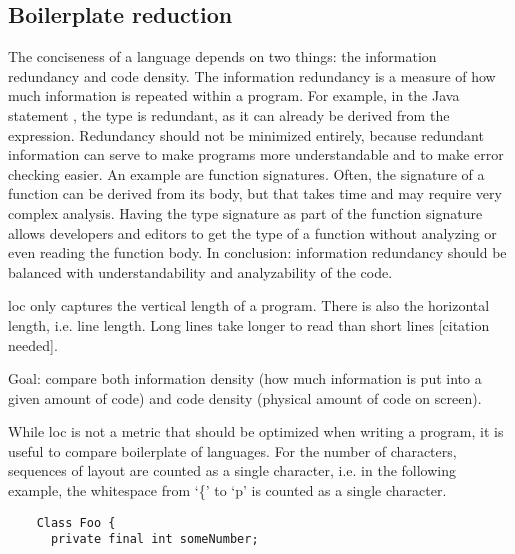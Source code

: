 \subsection{Boilerplate reduction}
\label{subsec:evaluation__analysis__boilerplate_reduction}

The conciseness of a language depends on two things: the information redundancy and code density.
The information redundancy is a measure of how much information is repeated within a program.
For example, in the Java statement , the type  is redundant, as it can already be derived from the expression.
Redundancy should not be minimized entirely, because redundant information can serve to make programs more understandable and to make error checking easier.
An example are function signatures.
Often, the signature of a function can be derived from its body, but that takes time and may require very complex analysis.
Having the type signature as part of the function signature allows developers and editors to get the type of a function without analyzing or even reading the function body.
In conclusion: information redundancy should be balanced with understandability and analyzability of the code.

\Ac{loc} only captures the vertical length of a program.
There is also the horizontal length, i.e. line length.
Long lines take longer to read than short lines [citation needed].


Goal: compare both information density (how much information is put into a given amount of code) and code density (physical amount of code on screen).

While \ac{loc} is not a metric that should be optimized when writing a program, it is useful to compare boilerplate of languages.
For the number of characters, sequences of layout are counted as a single character, i.e. in the following example, the whitespace from `\{' to `p' is counted as a single character.
\begin{lstlisting}
    Class Foo {
      private final int someNumber;
\end{lstlisting}


